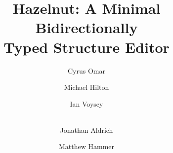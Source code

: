\documentclass{llncs}
\begin{document}
\mainmatter              %
%
\title{Hazelnut: A Minimal Bidirectionally \\Typed Structure Editor}
%
%
\author{Cyrus Omar \and Michael Hilton \and
Ian Voysey \and \\Jonathan Aldrich \and Matthew Hammer}
%
%
%

\maketitle              %
\end{document}
